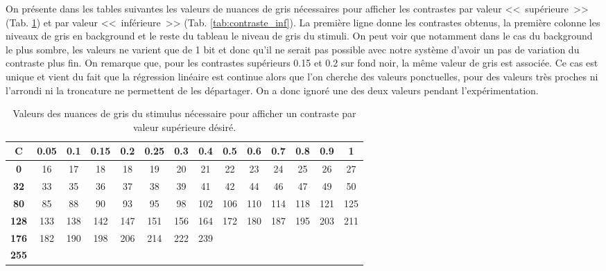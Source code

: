 	\par On présente dans les tables suivantes les valeurs de nuances de gris nécessaires pour afficher les contrastes par valeur <<~supérieure~>> (Tab. \ref{tab:contraste_sup}) et par valeur <<~inférieure~>> (Tab. \ref{tab:contraste_inf}). La première ligne donne les contrastes obtenus, la première colonne les niveaux de gris en background et le reste du tableau le niveau de gris du stimuli. On peut voir que notamment dans le cas du background le plus sombre, les valeurs ne varient que de 1 bit et donc qu'il ne serait pas possible avec notre système d'avoir un pas de variation du contraste plus fin. On remarque que, pour les contrastes supérieurs 0.15 et 0.2 sur fond noir, la même valeur de gris est associée. Ce cas est unique et vient du fait que la régression linéaire est continue alors que l'on cherche des valeurs ponctuelles, pour des valeurs très proches ni l'arrondi ni la troncature ne permettent de les départager. On a donc ignoré une des deux valeurs pendant l'expérimentation.
	
	\begin{table}[h]	
		\centering
		\caption{Valeurs des nuances de gris du stimulus nécessaire pour afficher un contraste par valeur supérieure désiré.}
		\label{tab:contraste_sup}
		\begin{tabular}{c|ccccccccccccc}
			\textbf{C} & \textbf{0.05} & \textbf{0.1} & \textbf{0.15} & \textbf{0.2} & \textbf{0.25} & \textbf{0.3} & \textbf{0.4} & \textbf{0.5} & \textbf{0.6} & \textbf{0.7} & \textbf{0.8} & \textbf{0.9} & \textbf{1}\\
			\hline
			\textbf{0} & 16  & 17  &  18  & 18 & 19 & 20 & 21 & 22 & 23 & 24 & 25 & 26 & 27\\
			\textbf{32} & 33 & 35 & 36 & 37 & 38 & 39 & 41 & 42 & 44 & 46 & 47 & 49 & 50\\
			\textbf{80} & 85 & 88 & 90 & 93 & 95 & 98 & 102 & 106 & 110 & 114 & 118 & 121 & 125\\
			\textbf{128} & 133 & 138 & 142 & 147 & 151 & 156 & 164 & 172 & 180 & 187 & 195 & 203 & 211\\
			\textbf{176} & 182 & 190 & 198 & 206 & 214 & 222 & 239\\
			\textbf{255}\\
		\end{tabular}
	\end{table}
	
